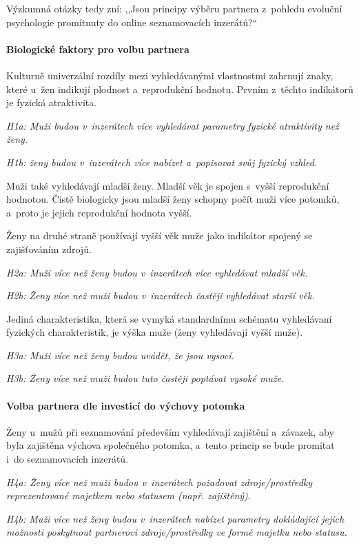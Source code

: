 \documentclass[a4paper, 12pt, notitlepage, oneside, numbers=noenddot]{report}
\begin{document}
Výzkumná otázky tedy zní: ,,Jsou principy výběru partnera z~pohledu
evoluční psychologie promítnuty do online seznamovacích inzerátů?``

\paragraph{Biologické faktory pro volbu partnera}

Kulturně univerzální rozdíly mezi vyhledávanými vlastnostmi zahrnují
znaky, které u~žen indikují plodnost a~reprodukční hodnotu.  Prvním
z~těchto indikátorů je fyzická atraktivita.

\emph{H1a: Muži budou v~inzerátech více vyhledávat parametry fyzické
  atraktivity než ženy.}

\emph{H1b: ženy budou v~inzerátech více nabízet a~popisovat svůj
  fyzický vzhled.}

Muži také vyhledávají mladší ženy.  Mladší věk je spojen s~vyšší
reprodukční hodnotou.  Čistě biologicky jsou mladší ženy schopny počít
muži více potomků, a~proto je jejich reprodukční hodnota vyšší.

Ženy na druhé straně používají vyšší věk muže jako indikátor spojený
se zajišťováním zdrojů.

\emph{H2a: Muži více než ženy budou v~inzerátech více vyhledávat mladší věk.}

\emph{H2b: Ženy více než muži budou v~inzerátech častěji vyhledávat starší věk.}

Jediná charakteristika, která se vymyká standardnímu schématu
vyhledávaní fyzických charakteristik, je výška muže (ženy vyhledávají
vyšší muže).

\emph{H3a: Muži více než ženy budou uvádět, že jsou vysocí.}

\emph{H3b: Ženy více než muži budou tuto častěji poptávat vysoké muže.}

\paragraph{Volba partnera dle investicí do výchovy potomka}

Ženy u~mužů při seznamování především vyhledávají zajištění a~závazek,
aby byla zajištěna výchova společného potomka, a~tento princip se bude
promítat i~do seznamovacích inzerátů.

\emph{H4a: Ženy více než muži budou v~inzerátech požadovat zdroje/prostředky
  reprezentované majetkem nebo statusem (např. zajištěný).}

\emph{H4b: Muži více než ženy budou v~inzerátech nabízet parametry
  dokládající jejich možnosti poskytnout partnerovi zdroje/prostředky
  ve formě majetku nebo statusu.}
\end{document}
